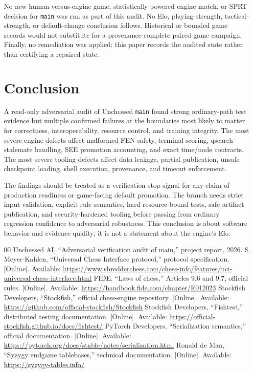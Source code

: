 \documentclass[conference]{IEEEtran}
\newcommand{\code}[1]{\texttt{\small #1}}
\begin{document}
No new human-versus-engine game, statistically powered engine match, or SPRT decision for \code{main} was run as part of this audit. No Elo, playing-strength, tactical-strength, or default-change conclusion follows. Historical or bounded game records would not substitute for a provenance-complete paired-game campaign. Finally, no remediation was applied; this paper records the audited state rather than certifying a repaired state.

\section{Conclusion}
A read-only adversarial audit of Unchessed \code{main} found strong ordinary-path test evidence but multiple confirmed failures at the boundaries most likely to matter for correctness, interoperability, resource control, and training integrity. The most severe engine defects affect malformed FEN safety, terminal scoring, qsearch stalemate handling, SEE promotion accounting, and exact time/node contracts. The most severe tooling defects affect data leakage, partial publication, unsafe checkpoint loading, shell execution, provenance, and timeout enforcement.

The findings should be treated as a verification stop signal for any claim of production readiness or game-facing default promotion. The branch needs strict input validation, explicit rule semantics, hard resource-bound tests, safe artifact publication, and security-hardened tooling before passing from ordinary regression confidence to adversarial robustness. This conclusion is about software behavior and evidence quality; it is not a statement about the engine's Elo.

\begin{thebibliography}{00}
 Unchessed AI, ``Adversarial verification audit of main,'' project report, 2026.
 S. Meyer-Kahlen, ``Universal Chess Interface protocol,'' protocol specification. [Online]. Available: \url{https://www.shredderchess.com/chess-info/features/uci-universal-chess-interface.html}
 FIDE, ``Laws of chess,'' Articles 9.6 and 9.7, official rules. [Online]. Available: \url{https://handbook.fide.com/chapter/E012023}
 Stockfish Developers, ``Stockfish,'' official chess-engine repository. [Online]. Available: \url{https://github.com/official-stockfish/Stockfish}
 Stockfish Developers, ``Fishtest,'' distributed testing documentation. [Online]. Available: \url{https://official-stockfish.github.io/docs/fishtest/}
 PyTorch Developers, ``Serialization semantics,'' official documentation. [Online]. Available: \url{https://pytorch.org/docs/stable/notes/serialization.html}
 Ronald de Man, ``Syzygy endgame tablebases,'' technical documentation. [Online]. Available: \url{https://syzygy-tables.info/}
\end{thebibliography}
\end{document}
